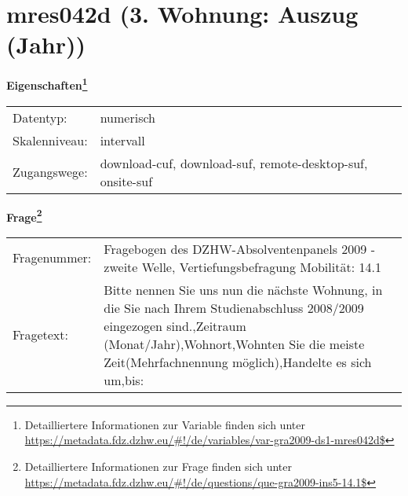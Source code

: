 
    \setcounter{footnote}{0}

    \vspace*{-1.8cm}
	\section{mres042d (3. Wohnung: Auszug (Jahr))}
	\label{section:mres042d}



    \vspace*{0.5cm}
    \noindent\textbf{Eigenschaften\footnote{Detailliertere Informationen zur Variable finden sich unter
		\url{https://metadata.fdz.dzhw.eu/\#!/de/variables/var-gra2009-ds1-mres042d$}}}\\
	\begin{tabularx}{\hsize}{@{}lX}
	Datentyp: & numerisch \\
	Skalenniveau: & intervall \\
	Zugangswege: &
	  download-cuf, 
	  download-suf, 
	  remote-desktop-suf, 
	  onsite-suf
 \\
    \end{tabularx}



				\vspace*{0.5cm}
                \noindent\textbf{Frage\footnote{Detailliertere Informationen zur Frage finden sich unter
		              \url{https://metadata.fdz.dzhw.eu/\#!/de/questions/que-gra2009-ins5-14.1$}}}\\
				\begin{tabularx}{\hsize}{@{}lX}
					Fragenummer: &
					  Fragebogen des DZHW-Absolventenpanels 2009 - zweite Welle, Vertiefungsbefragung Mobilität:
					  14.1
 \\
					Fragetext: & Bitte nennen Sie uns nun die nächste Wohnung, in die Sie nach Ihrem Studienabschluss 2008/2009 eingezogen sind.,Zeitraum (Monat/Jahr),Wohnort,Wohnten Sie die meiste Zeit(Mehrfachnennung möglich),Handelte es sich um,bis: \\
				\end{tabularx}





